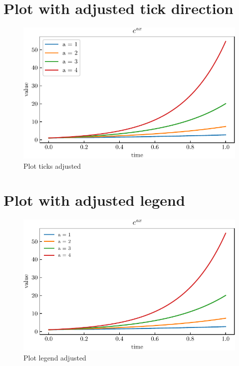 \documentclass{article}
\begin{document}
\section{Plot with adjusted tick direction}
\lipsum[7]
\begin{figure}[!ht]
    \centering
    \includegraphics{images/plot6.pdf}
    \caption{Plot ticks adjusted}
    \label{fig:plot_6}
\end{figure}
\clearpage

\section{Plot with adjusted legend}
\lipsum[8]
\begin{figure}[!ht]
    \centering
    \includegraphics{images/plot7.pdf}
    \caption{Plot legend adjusted}
    \label{fig:plot_7}
\end{figure}
\clearpage
\end{document}
